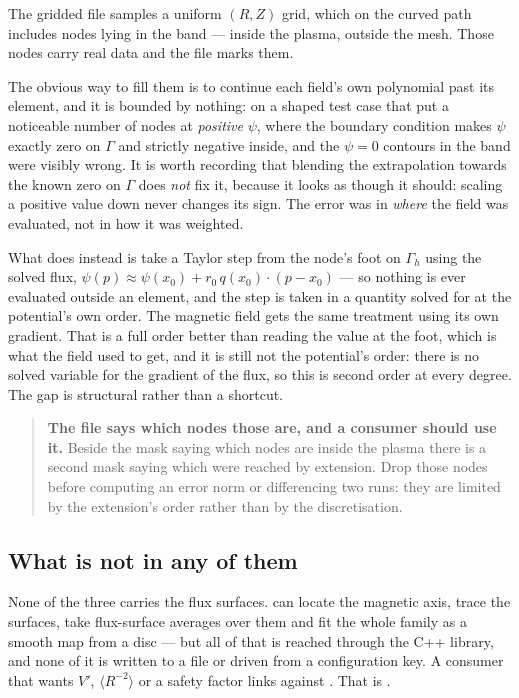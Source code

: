 The gridded file samples a uniform $(R,Z)$ grid, which on the curved path
includes nodes lying in the band --- inside the plasma, outside the mesh. Those
nodes carry real data and the file marks them.

The obvious way to fill them is to continue each field's own polynomial past its
element, and it is bounded by nothing: on a shaped test case that put a
noticeable number of nodes at \emph{positive} $\psi$, where the boundary
condition makes $\psi$ exactly zero on $\Gamma$ and strictly negative inside,
and the $\psi = 0$ contours in the band were visibly wrong. It is worth
recording that blending the extrapolation towards the known zero on $\Gamma$
does \emph{not} fix it, because it looks as though it should: scaling a positive
value down never changes its sign. The error was in \emph{where} the field was
evaluated, not in how it was weighted.

What {\meq} does instead is take a Taylor step from the node's foot on
$\Gamma_h$ using the solved flux, $\psi(p) \approx \psi(x_0) + r_0\, q(x_0)
\cdot (p - x_0)$ --- so nothing is ever evaluated outside an element, and the
step is taken in a quantity solved for at the potential's own order. The
magnetic field gets the same treatment using its own gradient. That is a full
order better than reading the value at the foot, which is what the field used to
get, and it is still not the potential's order: there is no solved variable for
the gradient of the flux, so this is second order at every degree. The gap is
structural rather than a shortcut.

\begin{quote}
	\textbf{The file says which nodes those are, and a consumer should use it.}
	Beside the mask saying which nodes are inside the plasma there is a second
	mask saying which were reached by extension. Drop those nodes before
	computing an error norm or differencing two runs: they are limited by the
	extension's order rather than by the discretisation.
\end{quote}

\subsection{What is not in any of them}

None of the three carries the flux surfaces. {\meq} can locate the magnetic
axis, trace the surfaces, take flux-surface averages over them and fit the whole
family as a smooth map from a disc --- but all of that is reached through the
C++ library, and none of it is written to a file or driven from a configuration
key. A consumer that wants $V'$, $\langle R^{-2}\rangle$ or a safety factor
links against {\meq}. That is .

